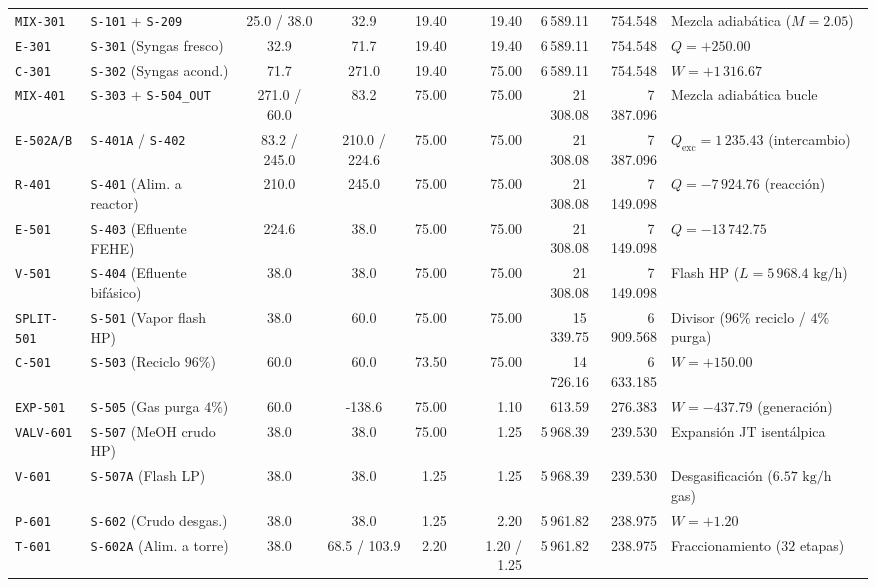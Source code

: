\documentclass[10pt,letterpaper]{article}
\begin{document}
\begin{landscape}
\begin{xltabular}{\linewidth}{l >{\raggedright\arraybackslash}p{2.9cm} c c r r r r >{\raggedleft\arraybackslash}X}
\texttt{MIX-301} & \texttt{S-101} + \texttt{S-209} & 25.0 / 38.0 & 32.9 & 19.40 & 19.40 & 6\,589.11 & 754.548 & Mezcla adiabática ($M=2.05$) \\
\texttt{E-301} & \texttt{S-301} (Syngas fresco) & 32.9 & 71.7 & 19.40 & 19.40 & 6\,589.11 & 754.548 & $Q = +250.00$ \\
\texttt{C-301} & \texttt{S-302} (Syngas acond.) & 71.7 & 271.0 & 19.40 & 75.00 & 6\,589.11 & 754.548 & $W = +1\,316.67$ \\
\texttt{MIX-401} & \texttt{S-303} + \texttt{S-504\_OUT} & 271.0 / 60.0 & 83.2 & 75.00 & 75.00 & 21\,308.08 & 7\,387.096 & Mezcla adiabática bucle \\
\texttt{E-502A/B} & \texttt{S-401A} / \texttt{S-402} & 83.2 / 245.0 & 210.0 / 224.6 & 75.00 & 75.00 & 21\,308.08 & 7\,387.096 & $Q_{\text{exc}} = 1\,235.43$ (intercambio) \\
\texttt{R-401} & \texttt{S-401} (Alim. a reactor) & 210.0 & 245.0 & 75.00 & 75.00 & 21\,308.08 & 7\,149.098 & $Q = -7\,924.76$ (reacción) \\
\texttt{E-501} & \texttt{S-403} (Efluente FEHE) & 224.6 & 38.0 & 75.00 & 75.00 & 21\,308.08 & 7\,149.098 & $Q = -13\,742.75$ \\
\texttt{V-501} & \texttt{S-404} (Efluente bifásico) & 38.0 & 38.0 & 75.00 & 75.00 & 21\,308.08 & 7\,149.098 & Flash HP ($L=5\,968.4\text{ kg/h}$) \\
\texttt{SPLIT-501} & \texttt{S-501} (Vapor flash HP) & 38.0 & 60.0 & 75.00 & 75.00 & 15\,339.75 & 6\,909.568 & Divisor ($96\%$ reciclo / $4\%$ purga) \\
\texttt{C-501} & \texttt{S-503} (Reciclo $96\%$) & 60.0 & 60.0 & 73.50 & 75.00 & 14\,726.16 & 6\,633.185 & $W = +150.00$ \\
\texttt{EXP-501} & \texttt{S-505} (Gas purga $4\%$) & 60.0 & -138.6 & 75.00 & 1.10 & 613.59 & 276.383 & $W = -437.79$ (generación) \\
\texttt{VALV-601} & \texttt{S-507} (MeOH crudo HP) & 38.0 & 38.0 & 75.00 & 1.25 & 5\,968.39 & 239.530 & Expansión JT isentálpica \\
\texttt{V-601} & \texttt{S-507A} (Flash LP) & 38.0 & 38.0 & 1.25 & 1.25 & 5\,968.39 & 239.530 & Desgasificación ($6.57\text{ kg/h}$ gas) \\
\texttt{P-601} & \texttt{S-602} (Crudo desgas.) & 38.0 & 38.0 & 1.25 & 2.20 & 5\,961.82 & 238.975 & $W = +1.20$ \\
\texttt{T-601} & \texttt{S-602A} (Alim. a torre) & 38.0 & 68.5 / 103.9 & 2.20 & 1.20 / 1.25 & 5\,961.82 & 238.975 & Fraccionamiento ($32$ etapas) \\

\end{xltabular}
\end{landscape}
\end{document}
